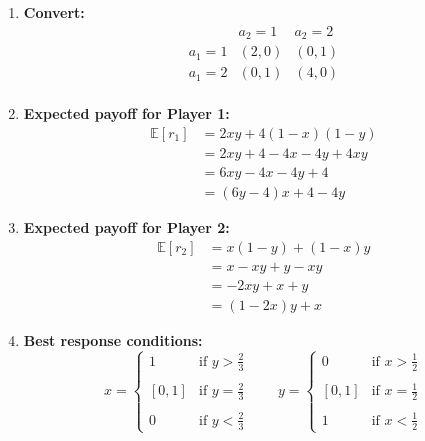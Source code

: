 \begin{example}
\begin{enumerate}
        \begin{enumerate}
            \item \textbf{Convert:}
            \[
                \begin{array}{c|c|c}
                & a_2 = 1 & a_2 = 2 \\
                \hline
                a_1 = 1 & (2,0) & (0,1) \\
                a_1 = 2 & (0,1) & (4,0) \\
                \end{array}
            \] 
            \item \textbf{Expected payoff for Player 1:}
            \[
            \begin{aligned}
            \mathbb{E}[r_1] &= 2xy + 4(1 - x)(1 - y) \\
            &= 2xy + 4 - 4x - 4y + 4xy \\
            &= 6xy - 4x - 4y + 4 \\
            &= (6y - 4)x + 4 - 4y
            \end{aligned}
            \]
        
            \item \textbf{Expected payoff for Player 2:}
            \[
            \begin{aligned}
            \mathbb{E}[r_2] &= x(1 - y) + (1-x)y \\
            &= x - xy + y - xy \\
            &= -2xy + x + y \\
            &=(1 - 2x)y + x
            \end{aligned}
            \]
        
            \item \textbf{Best response conditions:}
            \[
            x = 
            \begin{cases}
            1 & \text{if } y > \frac{2}{3} \\
            \\
            [0,1] & \text{if } y = \frac{2}{3} \\
            \\
            0 & \text{if } y < \frac{2}{3}
            \end{cases}
            \qquad
            y = 
            \begin{cases}
            0 & \text{if } x > \frac{1}{2} \\
            \\
            [0,1] & \text{if } x = \frac{1}{2} \\
            \\
            1 & \text{if } x < \frac{1}{2}
            \end{cases}
            \]
        

\end{enumerate}
\end{enumerate}
\end{example}
